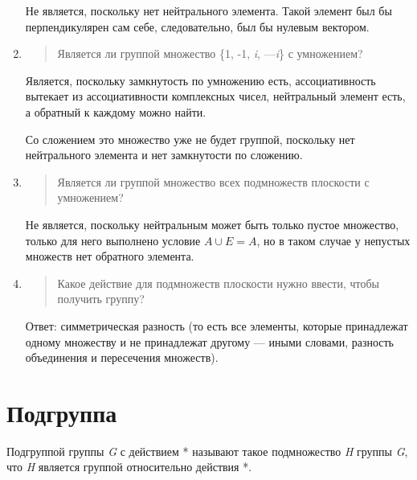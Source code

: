\documentclass[12pt]{article}
\begin{document}
\begin{enumerate}
              Не является, поскольку нет нейтрального элемента. Такой элемент был бы
              перпендикулярен сам себе, следовательно, был бы нулевым вектором.

        \item
              \begin{quote}
                  Является ли группой множество \{1, -1, \emph{i}, ---\emph{i}\} с
                  умножением?
              \end{quote}

              Является, поскольку замкнутость по умножению есть, ассоциативность
              вытекает из ассоциативности комплексных чисел, нейтральный элемент есть,
              а обратный к каждому можно найти.

              Со сложением это множество уже не будет группой, поскольку нет
              нейтрального элемента и нет замкнутости по сложению.

        \item
              \begin{quote}
                  Является ли группой множество всех подмножеств плоскости с умножением?
              \end{quote}

              Не является, поскольку нейтральным может быть только пустое множество,
              только для него выполнено условие $A \cup E = A$, но в таком случае у
              непустых множеств нет обратного элемента.

        \item
              \begin{quote}
                  Какое действие для подмножеств плоскости нужно ввести, чтобы получить
                  группу?
              \end{quote}

              Ответ: симметрическая разность (то есть все элементы, которые
              принадлежат одному множеству и не принадлежат другому --- иными словами,
              разность объединения и пересечения множеств).
    \end{enumerate}

    \section{Подгруппа}

    Подгруппой группы \emph{G} с действием * называют такое подмножество
    \emph{H} группы \emph{G}, что \emph{H} является группой относительно
    действия *.
\end{document}
